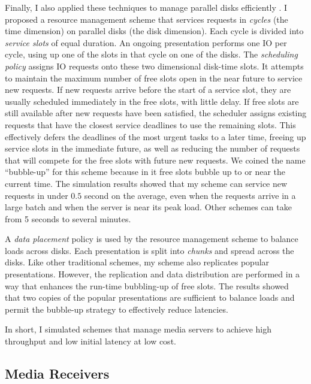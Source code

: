 Finally, I also applied these techniques
to manage parallel disks efficiently \cite{ex90-1}. 
I proposed a resource management scheme that
services requests in {\it cycles} (the time dimension) on
parallel disks (the disk dimension).  Each cycle is divided into {\it
service slots} of equal duration.  An ongoing presentation performs
one IO per cycle, using up one of the slots in that cycle on one of
the disks.  The {\em scheduling policy} assigns IO requests onto
these two dimensional disk-time slots.  It attempts to maintain the
maximum number of free slots open in the near future to service new
requests.  If new requests arrive before the start of a service slot,
they are usually scheduled immediately in the free slots, with little
delay.  If free slots are still available after new requests have
been satisfied, the scheduler assigns existing requests that have the
closest service deadlines to use the remaining slots.  This
effectively defers the deadlines of the most urgent tasks to a later
time, freeing up service slots in the immediate future, as well as
reducing the number of requests that will compete for the free slots
with future new requests.  We coined the
name ``bubble-up'' for this scheme because in it free
slots bubble up to or near the current time.  The simulation results
showed that my scheme can service new requests in under $0.5$ 
second on the average, even when the requests
arrive in a large batch and when the server is near its peak load.
Other schemes can take from 5 seconds to several minutes.        

A {\em data placement} policy is used by the resource management
scheme to balance loads across
disks.  Each presentation is split into {\em chunks} and spread
across the disks.  Like other traditional schemes, my
scheme also replicates popular
presentations.  However, the replication and data distribution are
performed in a way that enhances the run-time bubbling-up of free
slots.  The results showed that two copies
of the popular presentations are sufficient to balance loads and
permit the bubble-up strategy to effectively reduce latencies.

In short, I simulated schemes that manage media servers to
achieve high throughput and low initial latency at low cost.

\subsection{Media Receivers}

